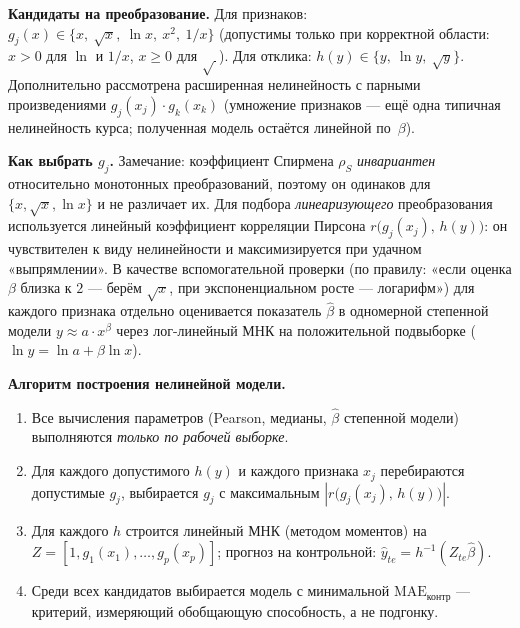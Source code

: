\documentclass[a4paper, 14pt]{extarticle}
\begin{document}
\medskip
\textbf{Кандидаты на преобразование.} Для признаков:
$g_j(x)\in\{x,\ \sqrt{x},\ \ln x,\ x^{2},\ 1/x\}$
(допустимы только при корректной области: $x>0$ для $\ln$ и $1/x$, $x\geq 0$ для $\sqrt{\,}$).
Для отклика: $h(y)\in\{y,\ \ln y,\ \sqrt{y}\}$. Дополнительно
рассмотрена расширенная нелинейность с парными произведениями $g_j(x_j)\cdot g_k(x_k)$
(умножение признаков --- ещё одна типичная нелинейность курса; полученная модель остаётся линейной по~$\beta$).

\medskip
\textbf{Как выбрать $g_j$.} Замечание: коэффициент Спирмена $\rho_S$ \textit{инвариантен} относительно
монотонных преобразований, поэтому он одинаков для $\{x,\sqrt{x},\ln x\}$ и не различает их. Для подбора
\textit{линеаризующего} преобразования используется линейный коэффициент корреляции Пирсона
$r\bigl(g_j(x_j),\,h(y)\bigr)$: он чувствителен к виду нелинейности и максимизируется при удачном «выпрямлении».
В качестве вспомогательной проверки (по правилу: «если оценка $\beta$ близка к $2$ --- берём $\sqrt{x}$, при
экспоненциальном росте --- логарифм») для каждого признака отдельно оценивается показатель $\hat{\beta}$
в одномерной степенной модели $y\approx a\cdot x^{\beta}$ через лог-линейный МНК на положительной подвыборке
(\(\ln y = \ln a + \beta \ln x\)).

\medskip
\textbf{Алгоритм построения нелинейной модели.}
\begin{enumerate}
  \item Все вычисления параметров (Pearson, медианы, $\hat\beta$ степенной модели) выполняются \textit{только по рабочей выборке}.
  \item Для каждого допустимого $h(y)$ и каждого признака $x_j$ перебираются допустимые $g_j$,
        выбирается $g_j$ с максимальным $|r\bigl(g_j(x_j),\,h(y)\bigr)|$.
  \item Для каждого $h$ строится линейный МНК (методом моментов) на $Z=[1, g_1(x_1),\ldots,g_p(x_p)]$;
        прогноз на контрольной: $\hat y_{te}=h^{-1}(Z_{te}\hat\beta)$.
  \item Среди всех кандидатов выбирается модель с минимальной $\mathrm{MAE}_{\text{контр}}$ ---
        критерий, измеряющий обобщающую способность, а не подгонку.
\end{enumerate}
\end{document}
